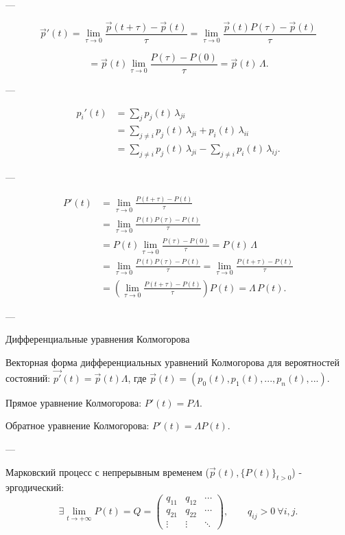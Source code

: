 ---

\[
	\vec{p}'(t)
	= \lim_{\tau \to 0}
	\frac{\vec{p}(t+\tau) - \vec{p}(t)}{\tau}
	=
	\lim_{\tau \to 0}
	\frac{\vec{p}(t){P}(\tau) - \vec{p}(t)}{\tau}
\]

\[
	= \vec{p}(t)
	\lim_{\tau \to 0}
	\frac{P(\tau) - P(0)}{\tau}
	= \vec{p}(t)\,{\Lambda}.
\]

---

\begin{align*}
	p_i'(t)
	 & = \sum_j p_j(t)\,\lambda_{ji}
	\\[4pt]
	 & = \sum_{j \ne i} p_j(t)\,\lambda_{ji} + p_i(t)\,\lambda_{ii}
	\\[4pt]
	 & = \sum_{j \ne i} p_j(t)\,\lambda_{ji} - \sum_{j \ne i} p_i(t)\,\lambda_{ij}.
\end{align*}

---

\begin{align*}
	{P}'(t)
	 & = \lim_{\tau \to 0}
	\frac{{P}(t+\tau) - {P}(t)}{\tau}
	\\[4pt]
	 & = \lim_{\tau \to 0}
	\frac{{P}(t){P}(\tau) - {P}(t)}{\tau}
	\\[4pt]
	 & = {P}(t)
	\lim_{\tau \to 0}
	\frac{{P}(\tau) - {P}(0)}{\tau}
		= {P}(t)\,{\Lambda}
	\\[4pt]
	 & = \lim_{\tau \to 0}
	\frac{{P}(t){P}(\tau) - {P}(t)}{\tau}
	= \lim_{\tau \to 0}
	\frac{{P}(t+\tau) - {P}(t)}{\tau}
	\\[4pt]
	 & =
	\left(
	\lim_{\tau \to 0}
	\frac{{P}(t+\tau) - {P}(t)}{\tau}
	\right)
	{P}(t)
	= {\Lambda}\,{P}(t).
\end{align*}

---


Дифференциальные уравнения Колмогорова

Векторная форма дифференциальных уравнений Колмогорова для вероятностей состояний:
$\vec{p'}(t)=\vec{p}(t)\Lambda$, где $\vec{p}(t)=(p_0(t),p_1(t),...,p_n(t),...)$.

Прямое уравнение Колмогорова: $P'(t)=P\Lambda$.

Обратное уравнение Колмогорова: $P'(t)=\Lambda P(t)$.

---

Марковский процесс с непрерывным временем ($\vec{p}(t), \{P(t)\}_{t>0}$) - эргодический:
\[
	\exists \lim_{t \to +\infty} {P}(t) = {Q}
	=
	\begin{pmatrix}
		q_{11} & q_{12} & \cdots \\
		q_{21} & q_{22} & \cdots \\
		\vdots & \vdots & \ddots
	\end{pmatrix},
	\qquad
	q_{ij} > 0 \ \forall i,j.
\]

